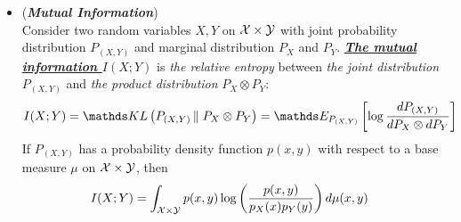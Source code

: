 \documentclass[11pt]{article}
\begin{document}
\begin{itemize}
\item \begin{definition}(\textbf{\emph{Mutual Information}}) \citep{thomas2006elements}\\
Consider two random variables $X, Y$ on ${\mathcal X} \times {\mathcal Y}$ with joint probability distribution $P_{(X, Y)}$ and marginal distribution $P_{X}$ and $P_{Y}$. \underline{\emph{\textbf{The mutual information $I(X; Y)$}}} is \emph{the relative entropy} between \emph{the joint distribution} $P_{(X, Y)}$ and \emph{the product distribution} $P_{X}\otimes P_{Y}$:
\begin{align*}
I(X; Y) &= \kl{P_{(X, Y)}}{P_{X}\otimes P_{Y}} = \E{P_{(X, Y)}}{\log \frac{dP_{(X,Y)}}{dP_{X} \otimes dP_{Y}}}
\end{align*} If $P_{(X, Y)}$ has a probability density function $p(x,y)$ with respect to a base measure $\mu$ on ${\mathcal X} \times {\mathcal Y}$, then 
\begin{align*}
I(X; Y) &=\int_{{\mathcal X} \times {\mathcal Y}} p(x, y)\log\left(\frac{p(x, y)}{p_{X}(x)p_{Y}(y)}\right) d\mu(x, y)
\end{align*}
\end{definition}


\end{itemize}
\end{document}
